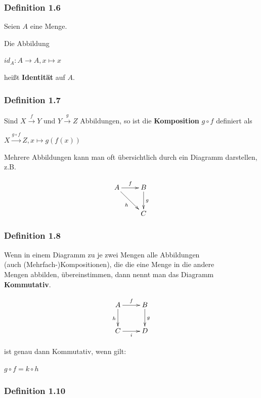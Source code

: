 \documentclass{scrartcl}
\begin{document}
\subsubsection{Definition 1.6}

Seien $A$ eine Menge.

Die Abbildung

$id_A:A\to A, x \mapsto x$

heißt \textbf{Identität} auf $A$.

\subsubsection{Definition 1.7}

Sind $X \stackrel{f}{\to} Y$ und $Y \stackrel{g}{\to} Z$ Abbildungen, so ist die \textbf{Komposition} $g\circ f$ definiert als

$X \stackrel{g \circ f}{\to} Z,x \mapsto g(f(x))$

Mehrere Abbildungen kann man oft übersichtlich durch ein Diagramm darstellen, z.B.

\begin{displaymath}
    \xymatrix{
        A \ar[r]^f \ar[dr]_h & B \ar[d]^{g} \\
                            & C }
\end{displaymath}

\subsubsection{Definition 1.8}

Wenn in einem Diagramm zu je zwei Mengen alle Abbildungen \\
(auch (Mehrfach-)Kompositionen), die die eine Menge in die andere \\ 
Mengen abbilden, übereinstimmen, dann nennt man das Diagramm \textbf{Kommutativ}.

\begin{displaymath}
    \xymatrix{
        A \ar[r]^f \ar[d]_h & B \ar[d]^{g} \\
        C \ar[r]_{i}       & D }
\end{displaymath}

ist genau dann Kommutativ, wenn gilt:

$g \circ f = k \circ h$

\subsubsection{Definition 1.10}
\end{document}
